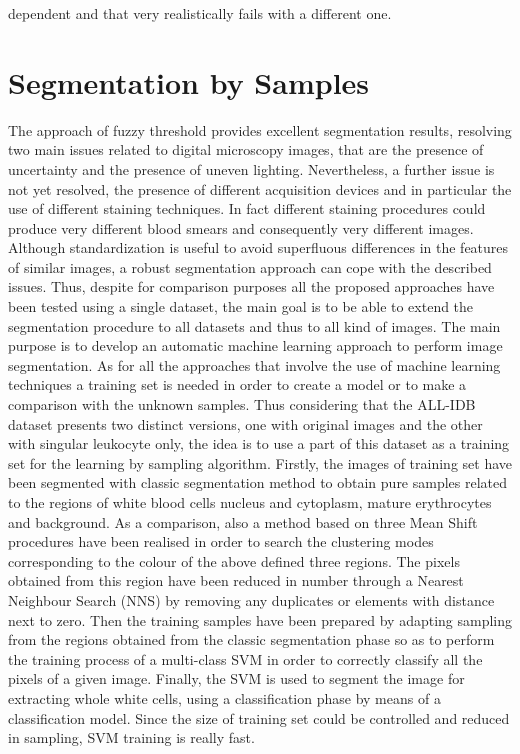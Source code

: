 \documentclass[final,a4paper,12pt,english]{UnicaPhdThesis3}
\begin{document}
dependent and that very realistically fails with a different one.
	
	\section{Segmentation by Samples}
	The approach of fuzzy threshold provides excellent segmentation results, resolving two main issues related to digital microscopy images, that are the presence of uncertainty and the presence of uneven lighting. Nevertheless, a further issue is not yet resolved, the presence of different acquisition devices and in particular the use of different staining techniques. In fact different staining procedures could produce very different blood smears and consequently very different images. Although standardization is useful to avoid superfluous differences in the features of similar images, a robust segmentation approach can cope with the described issues. Thus, despite for comparison purposes all the proposed approaches have been tested using a single dataset, the main goal is to be able to extend the segmentation procedure to all datasets and thus to all kind of images. The main purpose is to develop an automatic machine learning approach to perform image segmentation. As for all the approaches that involve the use of machine learning techniques a training set is needed in order to create a model or to make a comparison with the unknown samples. Thus considering that the ALL-IDB  dataset presents two distinct versions, one with original images and the other with singular leukocyte only, the idea is to use a part of this dataset as a training set for the learning by sampling algorithm. Firstly, the images of training set have been segmented with classic segmentation method to obtain pure samples related to the regions of white blood cells nucleus and cytoplasm, mature erythrocytes and background. As a comparison, also a method based on three Mean Shift \cite{fukunaga} procedures have been realised in order to search the clustering modes corresponding to the colour of the above defined three regions. The pixels obtained from this region have been reduced in number through a Nearest Neighbour Search (\acs{NNS}) by removing any duplicates or elements with distance next to zero. Then the training samples have been prepared by adapting sampling from the regions obtained from the classic segmentation phase so as to perform the training process of a multi-class SVM in order to correctly classify all the pixels of a given image. Finally, the SVM is used to segment the image for extracting whole white cells, using a classification phase by means of a classification model. Since the size of training set could be controlled and reduced in sampling, SVM training is really fast.
	
\end{document}
